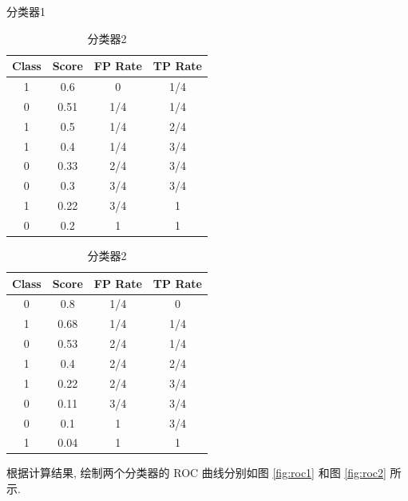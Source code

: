 \documentclass{article}
\begin{document}
\begin{table}
  \centering
  \begin{minipage}{0.4\textwidth}
    \centering
    \caption{分类器1}
    \label{tab:classifier1}
    \begin{tabular}{cccc}
      \toprule
      Class & Score & FP Rate & TP Rate \\
      \midrule
      1     & 0.6   & 0       & 1/4     \\
      0     & 0.51  & 1/4     & 1/4     \\
      1     & 0.5   & 1/4     & 2/4     \\
      1     & 0.4   & 1/4     & 3/4     \\
      0     & 0.33  & 2/4     & 3/4     \\
      0     & 0.3   & 3/4     & 3/4     \\
      1     & 0.22  & 3/4     & 1       \\
      0     & 0.2   & 1       & 1       \\
      \bottomrule   
    \end{tabular}
  \end{minipage}
  \begin{minipage}{0.4\textwidth}
    \centering
    \caption{分类器2}
    \label{tab:classifier2}
    \begin{tabular}{cccc}
      \toprule
      Class & Score & FP Rate & TP Rate \\
      \midrule
      0     & 0.8   & 1/4     & 0       \\
      1     & 0.68  & 1/4     & 1/4     \\
      0     & 0.53  & 2/4     & 1/4     \\
      1     & 0.4   & 2/4     & 2/4     \\
      1     & 0.22  & 2/4     & 3/4     \\
      0     & 0.11  & 3/4     & 3/4     \\
      0     & 0.1   & 1       & 3/4     \\
      1     & 0.04  & 1       & 1       \\
      \bottomrule   
    \end{tabular}
  \end{minipage}
\end{table}

根据计算结果, 绘制两个分类器的 ROC 曲线分别如图 \ref{fig:roc1} 和图 \ref{fig:roc2} 所示.
\end{document}
